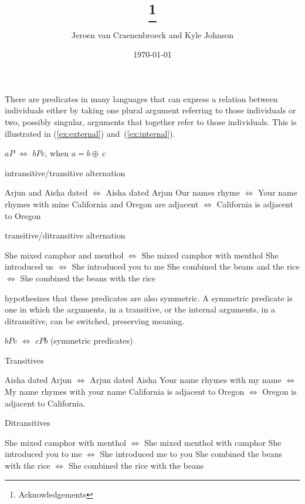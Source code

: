 \documentclass[twoside, 12pt]{article}
\title{\paper\thanks{Acknowledgements}}
\author{Jeroen van Craenenbroeck and Kyle Johnson}
\date{\today}
\begin{document}
\begin{titlepage} 
\maketitle 
\thispagestyle{empty}
\begin{abstract}

 \noindent 
 
 \end{abstract}
 \end{titlepage} 

\thispagestyle{empty}
\noindent
There are predicates in many languages that can express a relation between individuals either by taking one plural argument referring to those individuals or two, possibly singular, arguments that together refer to those individuals. This is illustrated in (\ref{ex:external}) and~(\ref{ex:internal}).
\begin{exe}
\raggedright
\ex \label{ex:plainsymm} $aP$ $\Leftrightarrow$ $bPc$, when $a = b \oplus\ c$
\begin{xlist}
  \ex \label{ex:external} intransitive/transitive alternation
  \begin{xlist}
    \ex Arjun and Aisha dated $\Leftrightarrow$ Aisha dated Arjun
    \ex Our names rhyme $\Leftrightarrow$ Your name rhymes with mine
    \ex California and Oregon are adjacent $\Leftrightarrow$ California is adjacent to Oregon
  \end{xlist}
  \ex \label{ex:internal} transitive/ditransitive alternation
  \begin{xlist}
    \ex She mixed camphor and menthol $\Leftrightarrow$ She mixed camphor with menthol
    \ex She introduced us $\Leftrightarrow$ She introduced you to me
    \ex She combined the beans and the rice $\Leftrightarrow$ She combined the beans with the rice
  \end{xlist}
\end{xlist}
\end{exe}
\citet{Winter:2018} hypothesizes that these predicates are also symmetric. A symmetric predicate is one in which the arguments, in a transitive, or the internal arguments, in a ditransitive, can be switched, preserving meaning.
\begin{exe}
\raggedright
  \ex \label{ex:symm} $bPc$ $\Leftrightarrow$ $cPb$ (symmetric predicates)
  \begin{xlist}
  \ex \label{ex:symmtrans} Transitives
  \begin{xlist}
    \ex Aisha dated Arjun $\Leftrightarrow$ Arjun dated Aisha
    \ex Your name rhymes with my name $\Leftrightarrow$ My name rhymes with your name
    \ex California is adjacent to Oregon $\Leftrightarrow$ Oregon is adjacent to California.
  \end{xlist}
  \ex Ditransitives
  \begin{xlist}
    \ex She mixed camphor with menthol $\Leftrightarrow$ She mixed menthol with camphor 
    \ex She introduced you to me $\Leftrightarrow$ She introduced me to you
    \ex She combined the beans with the rice $\Leftrightarrow$ She combined the rice with the beans
  \end{xlist}
\end{xlist}
\end{exe}
\end{document}
